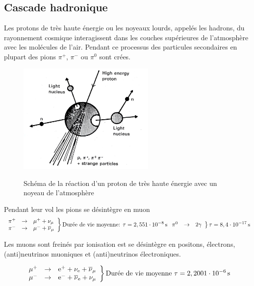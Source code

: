 \documentclass[a4paper,11pt,liststotocnumbered,bibtotocnumbered]{scrartcl}
\begin{document}
  \subsection{Cascade hadronique}
   Les protons de très haute énergie ou les noyeaux lourds, appelés les hadrons, du rayonnement cosmique interagissent dans les couches supérieures de l'atmosphère avec les molécules de l'air. Pendant ce processus des particules secondaires en plupart des pions $\pi^+$, $\pi^-$ ou $\pi^0$ sont crées. 
   \begin{figure}[htb]
    \center
    \includegraphics[width=0.6\textwidth]{bilder/03.jpg}
    \caption{Schéma de la réaction d'un proton de très haute énergie avec un noyeau de l'atmosphère}
    \cite[S.~133]{longair}
    \label{fig:preaktion}
   \end{figure}

   Pendant leur vol les pions se désintègre en muon
   \begin{equation*}
    \left.
    \begin{array}[]{lll}
     \pi^{+} & \rightarrow & \mu^{+} + \nu_{\mu}\\
     \pi^{-} & \rightarrow & \mu^{-} + \overline{\nu}_{\mu}\\	
    \end{array}
    \right\} \idx{Durée de vie moyenne: } \tau=\unit[2,551\cdot10^{-8}]{s}
    \left.
    \begin{array}[]{lll}
     \pi^{0} & \rightarrow & 2\gamma	
    \end{array}
    \right\} \tau=\unit[8,4\cdot10^{-17}]{s}
   \end{equation*}

   Les muons sont freinés par ionisation est se désintègre en positons, électrons, (anti)neutrinos muoniques et (anti)neutrinos électroniques. 

   \begin{equation*}
    \left.
    \begin{array}[]{lll}
     \mu^{+} & \rightarrow & \text{e}^{+} + \nu_{\text{e}} + \overline{\nu}_{\mu}\\
     \mu^{-} & \rightarrow & \text{e}^{-} + \overline{\nu}_{\text{e}} + \nu_{\mu}
    \end{array}
    \right\} \text{Durée de vie moyenne } \tau=\unit[2,2001\cdot10^{-6}]{s}
   \end{equation*}
\end{document}
